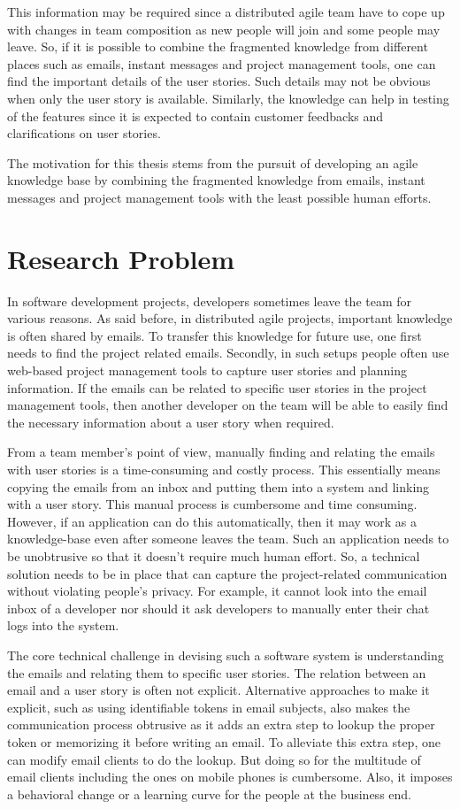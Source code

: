This information may be required since a distributed agile team have to cope up with changes in team composition as new people will join and some people may leave. So, if it is possible to combine the fragmented knowledge from different places such as emails, instant messages and project management tools, one can find the important details of the user stories. Such details may not be obvious when only the user story is available. Similarly, the knowledge can help in testing of the features since it is expected to contain customer feedbacks and clarifications on user stories.

The motivation for this thesis stems from the pursuit of developing an agile knowledge base by combining the fragmented knowledge from emails, instant messages and project management tools with the least possible human efforts.

\section{Research Problem}
In software development projects, developers sometimes leave the team for various reasons. As said before, in distributed agile projects, important knowledge is often shared by emails. To transfer this knowledge for future use, one first needs to find the project related emails. Secondly, in such setups people often use web-based project management tools to capture user stories and planning information. If the emails can be related to specific user stories in the project management tools, then another developer on the team will be able to easily find the necessary information about a user story when required.

From a team member's point of view, manually finding and relating the emails with user stories is a time-consuming and costly process. This essentially means copying the emails from an inbox and putting them into a system and linking with a user story. This manual process is cumbersome and time consuming. However, if an application can do this automatically, then it may work as a knowledge-base even after someone leaves the team. Such an application needs to be unobtrusive so that it doesn't require much human effort. So, a technical solution needs to be in place that can capture the project-related communication without violating people's privacy. For example, it cannot look into the email inbox of a developer nor should it ask developers to manually enter their chat logs into the system.  

The core technical challenge in devising such a software system is understanding the emails and relating them to specific user stories. The relation between an email and a user story is often not explicit. Alternative approaches to make it explicit, such as using identifiable tokens in email subjects, also makes the communication process obtrusive as it adds an extra step to lookup the proper token or memorizing it before writing an email. To alleviate this extra step, one can modify email clients to do the lookup. But doing so for the multitude of email clients including the ones on mobile phones is cumbersome. Also, it imposes a behavioral change or a learning curve for the people at the business end.

